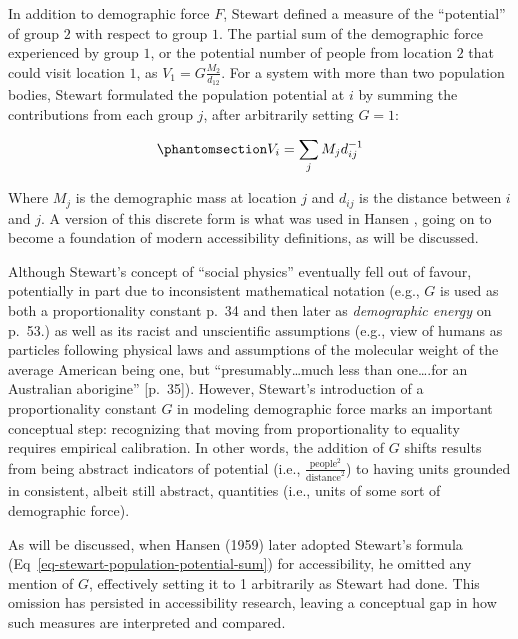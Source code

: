 \documentclass[
  10pt,
  letterpaper,
]{article}
\begin{document}
In addition to demographic force \(F\), Stewart defined a measure of the
``potential'' of group \(2\) with respect to group \(1\). The partial
sum of the demographic force experienced by group \(1\), or the
potential number of people from location \(2\) that could visit location
\(1\), as \(V_1 = G\frac{M_2}{d_{12}}\). For a system with more than two
population bodies, Stewart formulated the population potential at \(i\)
by summing the contributions from each group \(j\), after arbitrarily
setting \(G=1\):

\begin{equation}\phantomsection\label{eq-stewart-population-potential-sum}{
V_i = \sum_j M_jd_{ij}^{-1}
}\end{equation}

\noindent Where \(M_j\) is the demographic mass at location \(j\) and
\(d_{ij}\) is the distance between \(i\) and \(j\). A version of this
discrete form is what was used in Hansen \citep{hansen1959}, going on to
become a foundation of modern accessibility definitions, as will be
discussed.

Although Stewart's concept of ``social physics'' eventually fell out of
favour, potentially in part due to inconsistent mathematical notation
(e.g., \(G\) is used as both a proportionality constant p.~34 and then
later as \emph{demographic energy} on p.~53.) as well as its racist and
unscientific assumptions (e.g., view of humans as particles following
physical laws and assumptions of the molecular weight of the average
American being one, but ``presumably\ldots much less than one\ldots.for
an Australian aborigine'' {[}p.~35{]}). However, Stewart's introduction
of a proportionality constant \(G\) in modeling demographic force marks
an important conceptual step: recognizing that moving from
proportionality to equality requires empirical calibration. In other
words, the addition of \(G\) shifts results from being abstract
indicators of potential (i.e.,
\(\frac{\text{people}^2}{\text{distance}^{2}}\)) to having units
grounded in consistent, albeit still abstract, quantities (i.e., units
of some sort of demographic force).

As will be discussed, when Hansen (1959) \citep{hansen1959} later
adopted Stewart's formula (Eq~\ref{eq-stewart-population-potential-sum})
for accessibility, he omitted any mention of \(G\), effectively setting
it to 1 arbitrarily as Stewart had done. This omission has persisted in
accessibility research, leaving a conceptual gap in how such measures
are interpreted and compared.
\end{document}
